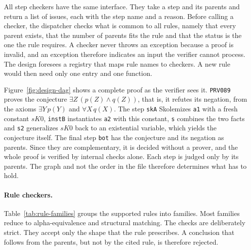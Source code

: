 All step checkers have the same interface. They take a step and its parents and return a list of issues, each with the step name and a reason.
Before calling a checker, the dispatcher checks what is common to all rules, namely that every parent exists, that the number of parents fits the rule and that the status is the one the rule requires.
A checker never throws an exception because a proof is invalid, and an exception therefore indicates an input the verifier cannot process.
The design foresees a registry that maps rule names to checkers. A new rule would then need only one entry and one function.

Figure~\ref{fig:design-dag} shows a complete proof as the verifier sees it.
\texttt{PRV089} proves the conjecture $\exists Z\,(p(Z) \land q(Z))$, that is, it refutes its negation, from the axioms $\exists Y\,p(Y)$ and $\forall X\,q(X)$.
The step \texttt{skA} Skolemizes \texttt{a1} with a fresh constant $\mathit{sK0}$, \texttt{instB} instantiates \texttt{a2} with this constant, \texttt{s} combines the two facts and \texttt{s2} generalizes $\mathit{sK0}$ back to an existential variable, which yields the conjecture itself.
The final step \texttt{bot} has the conjecture and its negation as parents.
Since they are complementary, it is decided without a prover, and the whole proof is verified by internal checks alone.
Each step is judged only by its parents. The graph and not the order in the file therefore determines what has to hold.

\paragraph{Rule checkers.}
\label{subsec:design-rules}

Table~\ref{tab:rule-families} groups the supported rules into families.
Most families reduce to alpha-equivalence and structural matching.
The checks are deliberately strict. They accept only the shape that the rule prescribes. A conclusion that follows from the parents, but not by the cited rule, is therefore rejected.

